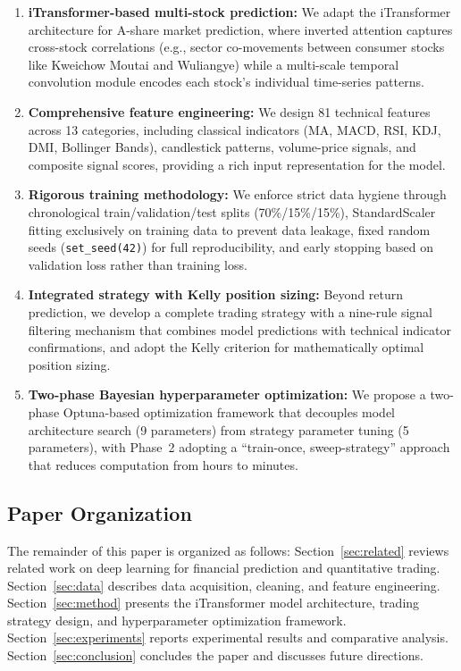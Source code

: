 \documentclass[12pt, a4paper]{article}
\begin{document}
\begin{enumerate}[leftmargin=2em]
    \item \textbf{iTransformer-based multi-stock prediction:} We adapt the iTransformer architecture for A-share market prediction, where inverted attention captures cross-stock correlations (e.g., sector co-movements between consumer stocks like Kweichow Moutai and Wuliangye) while a multi-scale temporal convolution module encodes each stock's individual time-series patterns.

    \item \textbf{Comprehensive feature engineering:} We design 81 technical features across 13 categories, including classical indicators (MA, MACD, RSI, KDJ, DMI, Bollinger Bands), candlestick patterns, volume-price signals, and composite signal scores, providing a rich input representation for the model.

    \item \textbf{Rigorous training methodology:} We enforce strict data hygiene through chronological train/validation/test splits (70\%/15\%/15\%), StandardScaler fitting exclusively on training data to prevent data leakage, fixed random seeds (\texttt{set\_seed(42)}) for full reproducibility, and early stopping based on validation loss rather than training loss.

    \item \textbf{Integrated strategy with Kelly position sizing:} Beyond return prediction, we develop a complete trading strategy with a nine-rule signal filtering mechanism that combines model predictions with technical indicator confirmations, and adopt the Kelly criterion for mathematically optimal position sizing.

    \item \textbf{Two-phase Bayesian hyperparameter optimization:} We propose a two-phase Optuna-based optimization framework that decouples model architecture search (9 parameters) from strategy parameter tuning (5 parameters), with Phase~2 adopting a ``train-once, sweep-strategy'' approach that reduces computation from hours to minutes.
\end{enumerate}

\subsection{Paper Organization}

The remainder of this paper is organized as follows: Section~\ref{sec:related} reviews related work on deep learning for financial prediction and quantitative trading. Section~\ref{sec:data} describes data acquisition, cleaning, and feature engineering. Section~\ref{sec:method} presents the iTransformer model architecture, trading strategy design, and hyperparameter optimization framework. Section~\ref{sec:experiments} reports experimental results and comparative analysis. Section~\ref{sec:conclusion} concludes the paper and discusses future directions.
\end{document}
